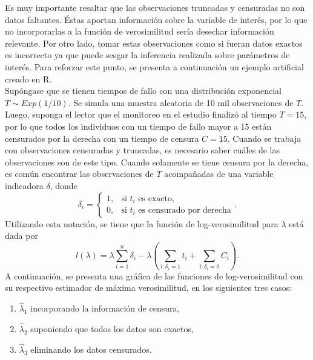\documentclass[11pt,a4paper]{article}
\begin{document}
Es muy importante resaltar que las observaciones truncadas y censuradas no son datos faltantes. Éstas aportan información sobre la variable de interés, por lo que no incorporarlas a la función de verosimilitud sería desechar información relevante. Por otro lado, tomar estas observaciones como si fueran datos exactos es incorrecto ya que puede sesgar la inferencia realizada sobre parámetros de interés. Para reforzar este punto, se presenta a continuación un ejemplo artificial creado en R.\\

Supóngase que se tienen tiempos de fallo con una distribución exponencial $T \sim Exp(1/10)$. Se simula una muestra aleatoria de 10 mil observaciones de $T$. Luego, suponga el lector que el monitoreo en el estudio finalizó al tiempo $T = 15$, por lo que todos los individuos con un tiempo de fallo mayor a 15 están censurados por la derecha con un tiempo de censura $C = 15$. Cuando se trabaja con observaciones censuradas y truncadas, es necesario saber cuáles de las observaciones son de este tipo. Cuando solamente se tiene censura por la derecha, es común encontrar las observaciones de $T$ acompañadas de una variable indicadora $\delta$, donde $$\delta_i = \begin{cases}
1, & \text{si } t_i \text{ es exacto},\\
0, & \text{si } t_i \text{ es censurado por derecha}
\end{cases}.$$ Utilizando esta notación, se tiene que la función de log-verosimilitud para $\lambda$ está dada por $$l(\lambda) = \lambda \sum_{i = 1}^n \delta_i - \lambda \left(\sum_{i: \delta_i = 1} t_i + \sum_{i: \delta_i = 0} C_i\right).$$ A continuación, se presenta una gráfica de las funciones de log-verosimilitud con su respectivo estimador de máxima verosimilitud, en los siguientes tres casos:
\begin{enumerate}
\item $\hat{\lambda}_1$ incorporando la información de censura,
\item $\hat{\lambda}_2$ suponiendo que todos los datos son exactos,
\item $\hat{\lambda}_3$ eliminando los datos censurados.\\
\end{enumerate}
\end{document}
